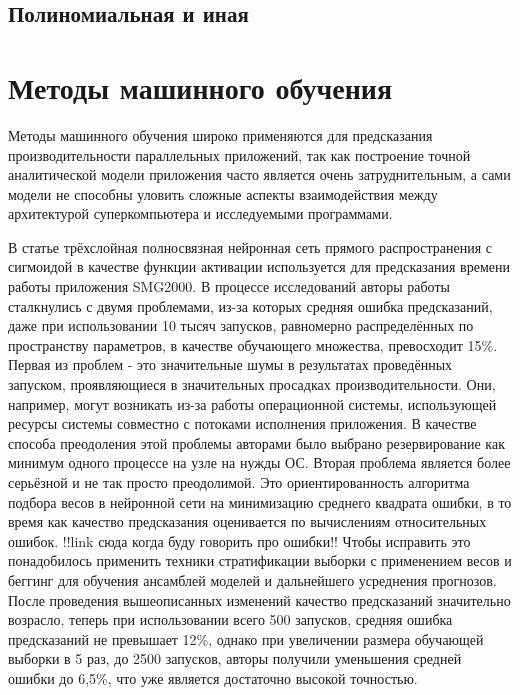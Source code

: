 


		\subsection{Полиномиальная и иная}
	\section{Методы машинного обучения}
	Методы машинного обучения широко применяются для предсказания производительности параллельных приложений, так как построение точной аналитической модели приложения часто является очень затруднительным, а сами модели не способны уловить сложные аспекты взаимодействия между архитектурой суперкомпьютера и исследуемыми программами.

	В статье \cite{ML_SMG2000} трёхслойная полносвязная нейронная сеть прямого распространения с сигмоидой в качестве функции активации используется для предсказания времени работы приложения SMG2000. В процессе исследований авторы работы сталкнулись с двумя проблемами, из-за которых средняя ошибка предсказаний, даже при использовании 10 тысяч запусков, равномерно распределённых по пространству параметров, в качестве обучающего множества, превосходит 15\%. Первая из проблем - это значительные шумы в результатах проведённых запуском, проявляющиеся в значительных просадках производительности. Они, например, могут возникать из-за работы операционной системы, использующей ресурсы системы совместно с потоками исполнения приложения. В качестве способа преодоления этой проблемы авторами было выбрано резервирование как минимум одного процессе на узле на нужды ОС. Вторая проблема является более серьёзной и не так просто преодолимой. Это ориентированность алгоритма подбора весов в нейронной сети на минимизацию среднего квадрата ошибки, в то время как качество предсказания оценивается по вычислениям относительных ошибок. !!link сюда когда буду говорить про ошибки!!
	Чтобы исправить это понадобилось применить техники стратификации выборки с применением весов и беггинг для обучения ансамблей моделей и дальнейшего усреднения прогнозов. После проведения вышеописанных изменений качество предсказаний значительно возрасло, теперь при использовании всего 500 запусков, средняя ошибка предсказаний не превышает 12\%, однако при увеличении размера обучающей выборки в 5 раз, до 2500 запусков, авторы получили уменьшения средней ошибки до 6,5\%, что уже является достаточно высокой точностью.


